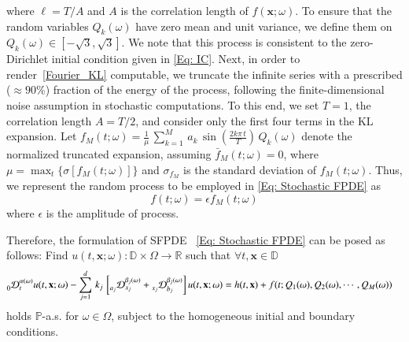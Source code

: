 where $\ell =T/A$ and $A$ is the correlation length of $f(\mathbf x;\omega)$. To ensure that the random variables $Q_k(\omega)$ have zero mean and unit variance, we define them on $Q_k(\omega) \in [-\sqrt 3, \sqrt 3]$. We note that this process is consistent to the zero-Dirichlet initial condition given in \eqref{Eq: IC}. Next, in order to render~\eqref{Fourier_KL} computable, we truncate the infinite series with a prescribed ($\approx 90\%$) fraction of the energy of the process, following the finite-dimensional noise assumption in stochastic computations. To this end, we set $T=1$, the correlation length $A=T/2$, and consider only the first four terms in the KL expansion. Let  $f_M(t;\omega) = \frac{1}{\mu} \, \sum_{k=1}^M \, a_k \, \sin\left(\frac{2 k \pi \, t}{T}\right) \, Q_k(\omega)$ denote the normalized truncated expansion, assuming $\bar{f}_M(t;\omega)=0$, where $\mu = \max_{t} \big\lbrace \sigma[f_M(t;\omega)] \big\rbrace$ and $\sigma_{f_M}$ is the standard deviation of $f_M(t;\omega)$. Thus, we represent the random process to be employed in \eqref{Eq: Stochastic FPDE} as
%
\begin{equation}
%
f(t;\omega) = \epsilon f_M(t;\omega)
%
\end{equation}
%  
where $\epsilon$ is the amplitude of process. 

Therefore, the formulation of SFPDE ~\eqref{Eq: Stochastic FPDE} can be posed as follows: Find $u(t,\textbf{x};\omega): \mathbb{D}\times \Omega \rightarrow \mathbb{R}$ such that $\forall  t,\textbf{x} \in \mathbb{D}$  
%
\begin{align}
\label{Doob_momentum-1}
%
\prescript{}{0}{\mathcal{D}}_{t}^{\alpha(\omega)} u(t,\textbf{x};\omega) 
& - \sum_{j=1}^{d} \, k_{j} \,\left[ \prescript{}{a_j}{\mathcal{D}}_{x_j}^{\beta_j(\omega)}
+ \prescript{}{x_j}{\mathcal{D}}_{b_j}^{\beta_j(\omega)} \right]
u(t,\textbf{x};\omega) 
= h(t,\textbf{x}) +  f(t;Q_1(\omega) , Q_2(\omega) , \cdots , Q_M(\omega)) 
%
\end{align}
%
holds $\mathbb{P}$-a.s. for $\omega \in \Omega$, subject to the homogeneous initial and boundary conditions.




%
